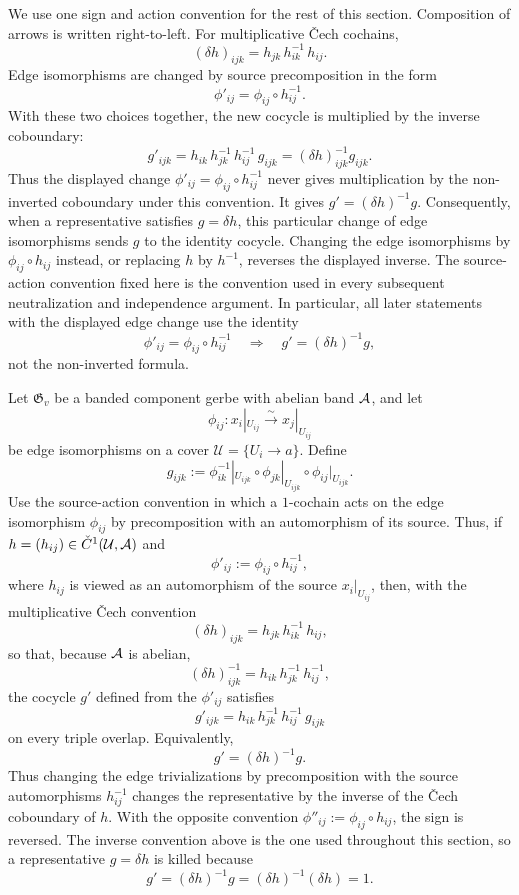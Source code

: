 ﻿We use one sign and action convention for the rest of this section. Composition
of arrows is written right-to-left. For multiplicative \v{C}ech cochains,
\[
(\delta h)_{ijk}=h_{jk}\,h_{ik}^{-1}\,h_{ij}.
\]
Edge isomorphisms are changed by source precomposition in the form
\[
\phi'_{ij}=\phi_{ij}\circ h_{ij}^{-1}.
\]
With these two choices together, the new cocycle is multiplied by the inverse
coboundary:
\[
g'_{ijk}=h_{ik}\,h_{jk}^{-1}\,h_{ij}^{-1}\,g_{ijk}
=
(\delta h)_{ijk}^{-1}g_{ijk}.
\]
Thus the displayed change $\phi'_{ij}=\phi_{ij}\circ h_{ij}^{-1}$ never gives
multiplication by the non-inverted coboundary under this convention. It gives
$g'=(\delta h)^{-1}g$. Consequently, when a representative satisfies
$g=\delta h$, this particular change of edge isomorphisms sends $g$ to the
identity cocycle. Changing the edge isomorphisms by $\phi_{ij}\circ h_{ij}$
instead, or replacing $h$ by $h^{-1}$, reverses the displayed inverse. The
source-action convention fixed here is the convention used in every subsequent
neutralization and independence argument. In particular, all later statements
with the displayed edge change use the identity
\[
\phi'_{ij}=\phi_{ij}\circ h_{ij}^{-1}
\quad\Longrightarrow\quad
g'=(\delta h)^{-1}g,
\]
not the non-inverted formula.

\begin{lemma}\label{lem:change-edge-trivializations}
Let $\mathfrak G_v$ be a banded component gerbe with abelian band $\mathcal{A}$, and let
\[
\phi_{ij}:x_i|_{U_{ij}}\xrightarrow{\sim}x_j|_{U_{ij}}
\]
be edge isomorphisms on a cover $\mathcal U=\{U_i\to a\}$. Define
\[
g_{ijk}:=\phi_{ik}^{-1}|_{U_{ijk}}\circ \phi_{jk}|_{U_{ijk}}\circ \phi_{ij}|_{U_{ijk}}.
\]
Use the source-action convention in which a $1$-cochain acts on the edge isomorphism $\phi_{ij}$ by precomposition with an automorphism of its source. Thus, if $h=(h_{ij})\in \check C^1(\mathcal U,\mathcal{A})$ and
\[
\phi'_{ij}:=\phi_{ij}\circ h_{ij}^{-1},
\]
where $h_{ij}$ is viewed as an automorphism of the source $x_i|_{U_{ij}}$, then, with the multiplicative \v{C}ech convention
\[
(\delta h)_{ijk}=h_{jk}\,h_{ik}^{-1}\,h_{ij},
\]
so that, because $\mathcal{A}$ is abelian,
\[
(\delta h)_{ijk}^{-1}=h_{ik}\,h_{jk}^{-1}\,h_{ij}^{-1},
\]
the cocycle $g'$ defined from the $\phi'_{ij}$ satisfies
\[
g'_{ijk}=h_{ik}\,h_{jk}^{-1}\,h_{ij}^{-1}\,g_{ijk}
\]
on every triple overlap. Equivalently,
\[
g'=(\delta h)^{-1}g.
\]
Thus changing the edge trivializations by precomposition with the source automorphisms $h_{ij}^{-1}$ changes the representative by the inverse of the \v{C}ech coboundary of $h$.
With the opposite convention $\phi''_{ij}:=\phi_{ij}\circ h_{ij}$, the sign is reversed. The inverse convention above is the one used throughout this section, so a representative $g=\delta h$ is killed because
\[
g'=(\delta h)^{-1}g=(\delta h)^{-1}(\delta h)=1.
\]
\end{lemma}

